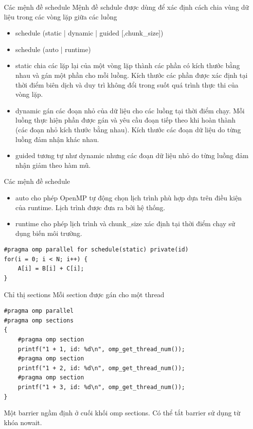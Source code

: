 \documentclass[10pt]{beamer}
\theoremstyle{remark}
\numberwithin{algocf}{section}
\numberwithin{equation}{section}
\numberwithin{dl}{section}
\numberwithin{figure}{section}
\begin{document}
\begin{frame}[fragile]{Các mệnh đề schedule}
    Mệnh đề schdule được dùng để xác định cách chia vùng dữ liệu trong các vòng lặp giữa các luồng
    \begin{itemize}
        \item schedule (static | dynamic | guided [,chunk\_size])
        \item schedule (auto | runtime)
    \end{itemize}
    \begin{itemize}
        \item static chia các lặp lại của một vòng lặp thành các phần có kích thước bằng nhau và gán một phần cho mỗi luồng.
        Kích thước các phần được xác định tại thời điểm biên dịch và duy trì không đổi trong suốt quá trình thực thi của vòng lặp.
        \item dynamic gán các đoạn nhỏ của dữ liệu cho các luồng tại thời điểm chạy.
        Mỗi luồng thực hiện phần được gán và yêu cầu đoạn tiếp theo khi hoàn thành (các đoạn nhỏ kích thước bằng nhau).
        Kích thước các đoạn dữ liệu do từng luồng đảm nhận khác nhau.
        \item guided tương tự như dynamic nhưng các đoạn dữ liệu nhỏ do từng luồng đảm nhận giảm theo hàm mũ.
    \end{itemize}
\end{frame}

\begin{frame}[fragile]{Các mệnh đề schedule}

    \begin{itemize}
        \item auto cho phép OpenMP tự động chọn lịch trình phù hợp dựa trên điều kiện của runtime.
        Lịch trình được đưa ra bởi hệ thống.
        \item runtime cho phép lịch trình và chunk\_size xác định tại thời điểm chạy sử dụng biến môi trường.
    \end{itemize}
    \begin{verbatim}
#pragma omp parallel for schedule(static) private(id)
for(i = 0; i < N; i++) {
    A[i] = B[i] + C[i];
}
    \end{verbatim}
\end{frame}

\begin{frame}[fragile]{Chỉ thị sections}
    Mỗi section được gán cho một thread
    \begin{verbatim}
#pragma omp parallel
#pragma omp sections
{
    #pragma omp section
    printf("1 + 1, id: %d\n", omp_get_thread_num());
    #pragma omp section
    printf("1 + 2, id: %d\n", omp_get_thread_num());
    #pragma omp section
    printf("1 + 3, id: %d\n", omp_get_thread_num());
}
    \end{verbatim}

    Một barrier ngầm định ở cuối khối omp sections.
    Có thể tắt barrier sử dụng từ khóa nowait.
\end{frame}
\end{document}
